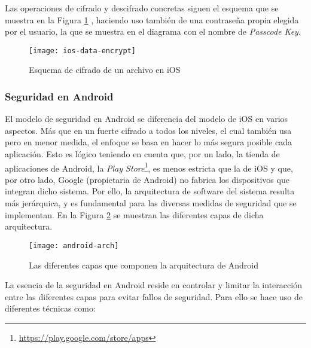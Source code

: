 Las operaciones de cifrado y descifrado concretas siguen el esquema que se muestra en la Figura \ref{fig:ios-data-encrypt} , haciendo uso también de una contraseña propia elegida por el usuario, la que se muestra en el diagrama con el nombre de \textit{Passcode Key}.

\begin{figure}[H]
	\centering
	\texttt{[image: ios-data-encrypt]}
	\caption{Esquema de cifrado de un archivo en iOS}
	\label{fig:ios-data-encrypt}
\end{figure}

\subsubsection{Seguridad en Android}

El modelo de seguridad en Android se diferencia del modelo de iOS en varios aspectos. Más que en un fuerte cifrado a todos los niveles, el cual también usa pero en menor medida, el enfoque se basa en hacer lo más segura posible cada aplicación. Esto es lógico teniendo en cuenta que, por un lado, la tienda de aplicaciones de Android, la \textit{Play Store}\footnote{\url{https://play.google.com/store/apps}}, es menos estricta que la de iOS y que, por otro lado, Google (propietaria de Android) no fabrica los dispositivos que integran dicho sistema. Por ello, la arquitectura de software del sistema resulta más jerárquica, y es fundamental para las diversas medidas de seguridad que se implementan. En la Figura \ref{fig:android-arch} se muestran las diferentes capas de dicha arquitectura. 

\begin{figure}[H]
	\centering
	\texttt{[image: android-arch]}
	\caption{Las diferentes capas que componen la arquitectura de Android}
	\label{fig:android-arch}
\end{figure}

La esencia de la seguridad en Android reside en controlar y limitar la interacción entre las diferentes capas para evitar fallos de seguridad. Para ello se hace uso de diferentes técnicas \cite{android-sec-guide} \cite{jspdcp-2014} como:

